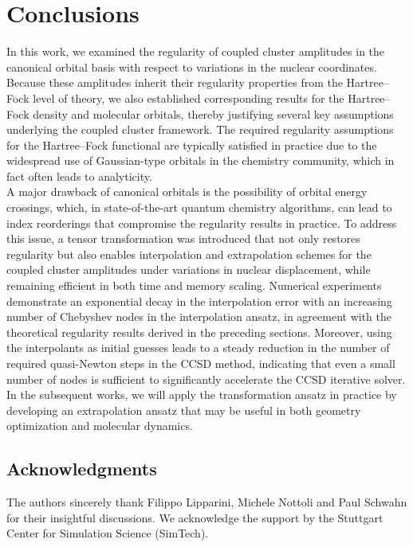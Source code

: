 \documentclass[reqno]{amsart}
\begin{document}
\section{Conclusions}\label{conclusion}
In this work, we examined the regularity of coupled cluster amplitudes in the canonical orbital basis with respect to variations in the nuclear coordinates. Because these amplitudes inherit their regularity properties from the Hartree–Fock level of theory, we also established corresponding results for the Hartree–Fock density and molecular orbitals, thereby justifying several key assumptions underlying the coupled cluster framework. The required regularity assumptions for the Hartree–Fock functional are typically satisfied in practice due to the widespread use of Gaussian-type orbitals in the chemistry community, which in fact often leads to analyticity.\\
\newline
A major drawback of canonical orbitals is the possibility of orbital energy crossings, which, in state-of-the-art quantum chemistry algorithms, can lead to index reorderings that compromise the regularity results in practice. To address this issue, a tensor transformation was introduced that not only restores regularity but also enables interpolation and extrapolation schemes for the coupled cluster amplitudes under variations in nuclear displacement, while remaining efficient in both time and memory scaling. Numerical experiments demonstrate an exponential decay in the interpolation error with an increasing number of Chebyshev nodes in the interpolation ansatz, in agreement with the theoretical regularity results derived in the preceding sections. Moreover, using the interpolants as initial guesses leads to a steady reduction in the number of required quasi-Newton steps in the CCSD method, indicating that even a small number of nodes is sufficient to significantly accelerate the CCSD iterative solver. In the subsequent works, we will apply the transformation ansatz in practice by developing an extrapolation ansatz that may be useful in both geometry optimization and molecular dynamics.








\subsection*{Acknowledgments} The authors sincerely thank Filippo Lipparini, Michele Nottoli and Paul Schwahn for their insightful discussions.
We acknowledge the support by the
Stuttgart Center for Simulation Science (SimTech).



    
\end{document}
